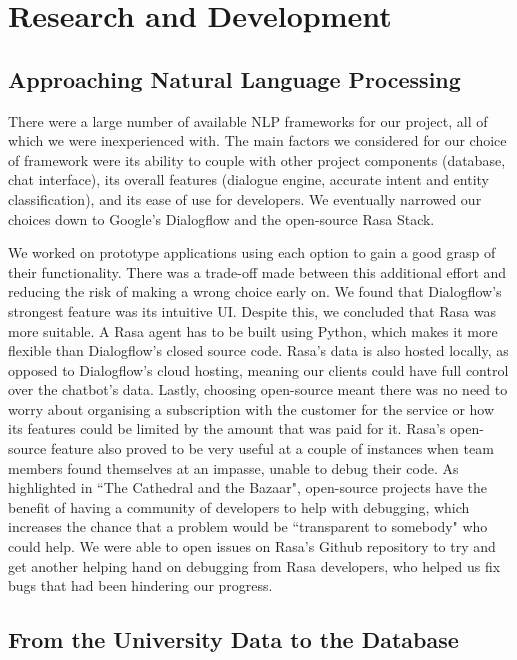\documentclass{l3proj}
\begin{document}

\section{Research and Development}
\label{sec:rationale}

\subsection{Approaching Natural Language Processing}

There were a large number of available NLP frameworks for our project, all of which we were inexperienced with. The main factors we considered for our choice of framework were its ability to couple with other project components (database, chat interface), its overall features (dialogue engine, accurate intent and entity classification), and its ease of use for developers. We eventually narrowed our choices down to Google's Dialogflow and the open-source Rasa Stack.

We worked on prototype applications using each option to gain a good grasp of their functionality. There was a trade-off made between this additional effort and reducing the risk of making a wrong choice early on. We found that Dialogflow's strongest feature was its intuitive UI. Despite this, we concluded that Rasa was more suitable. A Rasa agent has to be built using Python, which makes it more flexible than Dialogflow's closed source code. Rasa's data is also hosted locally, as opposed to Dialogflow's cloud hosting, meaning our clients could have full control over the chatbot's data. Lastly, choosing open-source meant there was no need to worry about organising a subscription with the customer for the service or how its features could be limited by the amount that was paid for it. Rasa's open-source feature also proved to be very useful at a couple of instances when team members found themselves at an impasse, unable to debug their code. As highlighted in ``The Cathedral and the Bazaar", open-source projects have the benefit of having a community of developers to help with debugging, which increases the chance that a problem would be ``transparent to somebody" who could help\cite{cathedral:Raymond}. We were able to open issues on Rasa's Github repository to try and get another helping hand on debugging from Rasa developers, who helped us fix bugs that had been hindering our progress.

\subsection{From the University Data to the Database}
\end{document}

